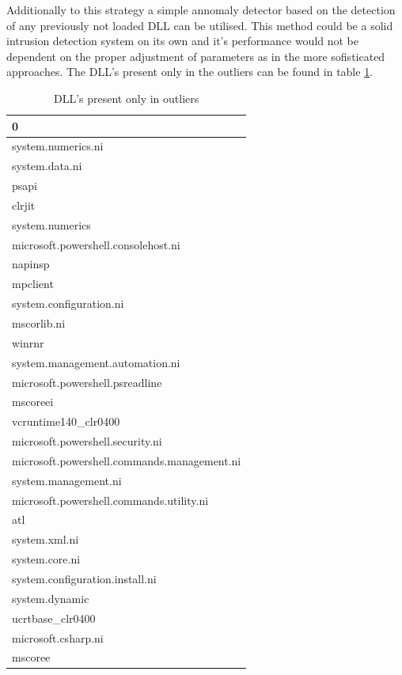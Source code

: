 \documentclass[a4paper,twoside,12pt]{book}
\begin{document}
Additionally to this strategy a simple annomaly detector based on the detection of any previously not loaded
DLL can be utilised. This method could be a solid intrusion detection system on its own and it's performance
would not be dependent on the proper adjustment of parameters as in the more sofisticated approaches. The 
DLL's present only in the outliers can be found in table \ref{id:tab:outlierDLLs}.

\begin{table}
	\centering
	\caption{DLL's present only in outliers}
	\label{id:tab:outlierDLLs}
\begin{tabular}{l}
	\toprule
											   0 \\
	\midrule
							  system.numerics.ni \\
								  system.data.ni \\
										   psapi \\
										  clrjit \\
								 system.numerics \\
			 microsoft.powershell.consolehost.ni \\
										 napinsp \\
										mpclient \\
						 system.configuration.ni \\
									 mscorlib.ni \\
										  winrnr \\
				 system.management.automation.ni \\
				 microsoft.powershell.psreadline \\
										mscoreei \\
							vcruntime140\_clr0400 \\
				microsoft.powershell.security.ni \\
	 microsoft.powershell.commands.management.ni \\
							system.management.ni \\
		microsoft.powershell.commands.utility.ni \\
											 atl \\
								   system.xml.ni \\
								  system.core.ni \\
				 system.configuration.install.ni \\
								  system.dynamic \\
								ucrtbase\_clr0400 \\
							 microsoft.csharp.ni \\
										 mscoree \\

\end{tabular}
\end{table}
\end{document}
